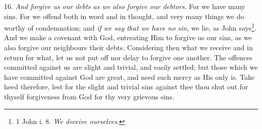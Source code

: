 16. \emph{And forgive us our debts as we also forgive our debtors}. For we have many sins. For we offend both in word and in thought, and very many things we do worthy of condemnation; and \emph{if we say that we have no sin}, we lie, as John says\footnote{1 John i. 8. \emph{We deceive ourselves}.}. And we make a covenant with God, entreating Him to forgive us our sins, as we also forgive our neighbours their debts. Considering then what we receive and in return for what, let us not put off nor delay to forgive one another. The offences committed against us are slight and trivial, and easily settled; but those which we have committed against God are great, and need such mercy as His only is. Take heed therefore, lest for the slight and trivial sins against thee thou shut out for thyself forgiveness from God for thy very grievous sins.

